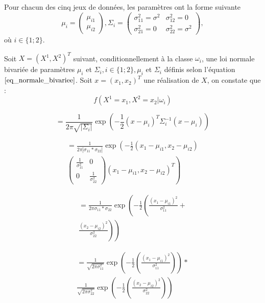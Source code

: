 \documentclass{article}
\begin{document}
\begin{multicols}{2}
Pour chacun des cinq jeux de données, les paramètres ont la forme suivante
 \begin{equation}
 \label{eq_normale_bivariee}
 	\mu_i = 
	\begin{pmatrix}
	\mu_{i1} \\
	\mu_{i2}
	\end{pmatrix},
	\Sigma_i = 
	\begin{pmatrix}
	\sigma_{11}^2 = \sigma^2 & \sigma_{12}^2 = 0 \\
	\sigma_{21}^2 = 0 & \sigma_{22}^2 = \sigma^2
	\end{pmatrix}, 
\end{equation}
où $i \in \{1 ; 2 \} .$

Soit $X = {(X^1, X^2)}^{T}$ suivant, conditionnellement à la classe $\omega_i$, une loi normale bivariée de paramètres $\mu_i$ et $\Sigma_i, i \in \{1 ; 2 \}, \mu_i$ et $\Sigma_i$ définis selon l'équation $\ref{eq_normale_bivariee}$. Soit $x = {(x_1, x_2)}^{T}$ une réalisation de $X$, on constate que :
\[
f(X^1 = x_1, X^2 = x_2 | \omega_i )
\]

\[
= \frac{1}{2 \pi \sqrt{|\Sigma_i|}} \exp \left(-\frac{1}{2}(x - \mu_i)^T \Sigma_i^{-1} (x - \mu_i) \right) 
\]

\[
\begin{split}
= \frac{1}{2 \pi |\sigma_{11} * \sigma_{22}|} \exp \left( -\frac{1}{2} (x_1 - \mu_{i1}, x_2 - \mu_{i2}) \right. \\
\left. 
\begin{pmatrix}
	\frac{1}{\sigma_{11}^2} & 0 \\
	0 & \frac{1}{\sigma_{22}^2}
\end{pmatrix}
(x_1 - \mu_{i1}, x_2 - \mu_{i2})^T \right)
\end{split}
\]

\[
\begin{split}
= \frac{1}{2\pi \sigma_{11} * \sigma_{22}} \exp \left( -\frac{1}{2} \left( \frac{(x_1 - \mu_{i1})^2}{\sigma_{11}^2} + \right. \right. \\ 
\left. \left. \frac{(x_2 - \mu_{i2})^2}{\sigma_{22}^2} \right) \right)
\end{split}
\]

\[
\begin{split}
= \frac{1}{\sqrt{2 \pi \sigma_{11}^2}} \exp \left( -\frac{1}{2} \left( \frac{(x_1 - \mu_{i1})^2}{\sigma_{11}^2} \right) \right) * \\
\frac{1}{\sqrt{2 \pi \sigma_{22}^2}} \exp \left( -\frac{1}{2} \left( \frac{(x_2 - \mu_{i2})^2}{\sigma_{22}^2} \right) \right)
\end{split}
\]


\end{multicols}
\end{document}
